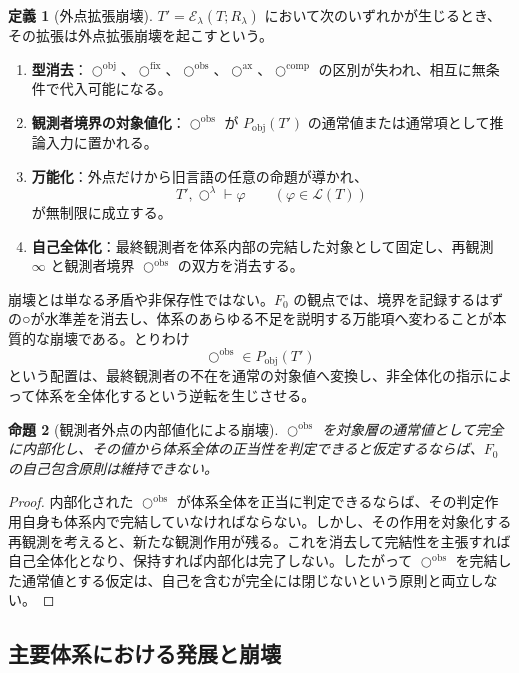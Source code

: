 \documentclass[a4paper,11pt]{ltjsarticle}
\theoremstyle{definition}
\newtheorem{definition}{定義}[section]
\theoremstyle{plain}
\newtheorem{proposition}[definition]{命題}
\newcommand{\Pobj}{P_{\mathrm{obj}}}
\newcommand{\ofix}{\bigcirc^{\mathrm{fix}}}
\newcommand{\oobs}{\bigcirc^{\mathrm{obs}}}
\newcommand{\oobj}{\bigcirc^{\mathrm{obj}}}
\newcommand{\oax}{\bigcirc^{\mathrm{ax}}}
\newcommand{\ocomp}{\bigcirc^{\mathrm{comp}}}
\newcommand{\CircleExt}{\mathcal{E}}
\begin{document}
\begin{definition}[外点拡張崩壊]
$T'=\CircleExt_\lambda(T;R_\lambda)$ において次のいずれかが生じるとき、その拡張は外点拡張崩壊を起こすという。
\begin{enumerate}
 \item \textbf{型消去}：$\oobj$、$\ofix$、$\oobs$、$\oax$、$\ocomp$ の区別が失われ、相互に無条件で代入可能になる。
 \item \textbf{観測者境界の対象値化}：$\oobs$ が $\Pobj(T')$ の通常値または通常項として推論入力に置かれる。
 \item \textbf{万能化}：外点だけから旧言語の任意の命題が導かれ、
 \[
  T',\bigcirc^\lambda\vdash\varphi
  \qquad
  (\varphi\in\mathcal L(T))
 \]
 が無制限に成立する。
 \item \textbf{自己全体化}：最終観測者を体系内部の完結した対象として固定し、再観測 $\infty$ と観測者境界 $\oobs$ の双方を消去する。
\end{enumerate}
\end{definition}

崩壊とは単なる矛盾や非保存性ではない。$F_0$ の観点では、境界を記録するはずの○が水準差を消去し、体系のあらゆる不足を説明する万能項へ変わることが本質的な崩壊である。とりわけ
\[
 \oobs\in\Pobj(T')
\]
という配置は、最終観測者の不在を通常の対象値へ変換し、非全体化の指示によって体系を全体化するという逆転を生じさせる。

\begin{proposition}[観測者外点の内部値化による崩壊]
$\oobs$ を対象層の通常値として完全に内部化し、その値から体系全体の正当性を判定できると仮定するならば、$F_0$ の自己包含原則は維持できない。
\end{proposition}

\begin{proof}
内部化された $\oobs$ が体系全体を正当に判定できるならば、その判定作用自身も体系内で完結していなければならない。しかし、その作用を対象化する再観測を考えると、新たな観測作用が残る。これを消去して完結性を主張すれば自己全体化となり、保持すれば内部化は完了しない。したがって $\oobs$ を完結した通常値とする仮定は、自己を含むが完全には閉じないという原則と両立しない。
\end{proof}

\subsection{主要体系における発展と崩壊}
\end{document}
